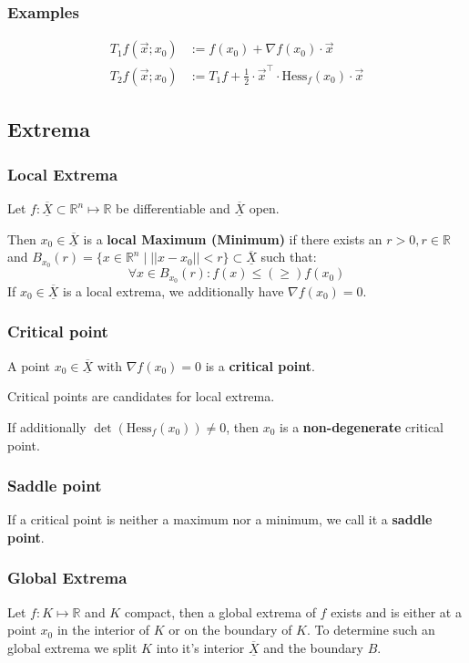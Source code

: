\documentclass[a4paper,fontsize = 8pt]{scrartcl}
\def\R{\mathbb{R}}
\def\X{\underline{\overline{X}}}
\begin{document}
\subsubsection*{Examples}
\begin{align*}
  T_1 f(\vec{x}; x_0) &:= f(x_0) + \nabla f(x_0) \cdot \vec{x} \\
  T_2 f(\vec{x}; x_0) &:= T_1f + \frac{1}{2} \cdot \vec{x}^\top \cdot \text{Hess}_f(x_0) \cdot \vec{x}
\end{align*}


\subsection{Extrema}
\subsubsection*{Local Extrema}
Let \(f: \X \subset \R^n \mapsto \R\) be differentiable and \(\X\) open. 

Then \(x_0 \in \X\) is a \textbf{local Maximum (Minimum)} if there exists an $r > 0, r \in \R$ and \(B_{x_0}(r) = \{x\in \R^n \mid ||x-x_0|| < r \} \subset \X\) such that:
\[\forall x \in B_{x_0}(r): f(x) \le (\ge) f(x_0)\]
If \(x_0 \in \X\) is a local extrema, we additionally have \(\nabla f(x_0) = 0\).

\subsubsection*{Critical point}
A point \(x_0 \in \X\) with \(\nabla f(x_0) = 0\) is a \textbf{critical point}. 

Critical points are candidates for local extrema.

If additionally \(\det(\text{Hess}_f(x_0)) \ne 0\), then \(x_0\) is a \textbf{non-degenerate} critical point.

\subsubsection*{Saddle point}
If a critical point is neither a maximum nor a minimum, we call it a \textbf{saddle point}.

\subsubsection*{Global Extrema}
Let \(f: K \mapsto \R\) and \(K\) compact, then a global extrema of \(f\) exists and is either at a point $x_0$ in the interior of \(K\) or on the boundary of $K$. To determine such an global extrema we split \(K\) into it's interior \(\X\) and the boundary \(B\). 
\end{document}

